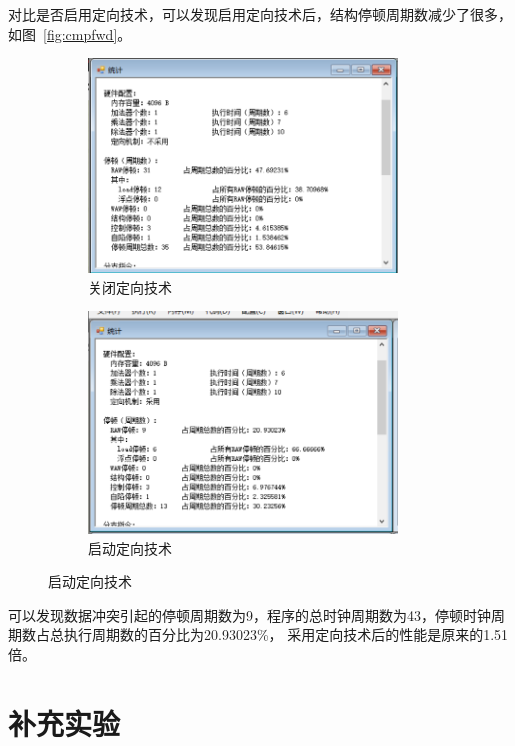 \documentclass[a4paper,twoside]{article}
\begin{document}
\begin{spacing}{1.2}
对比是否启用定向技术，可以发现启用定向技术后，结构停顿周期数减少了很多，如图~\ref{fig:cmpfwd}。
\begin{figure}[htb]
	\centering
	\begin{subfigure}[b]{0.4\textwidth}
		\centering
		\includegraphics[width=0.9\textwidth]{images/nofwdsts.png}
		\caption{关闭定向技术}
		\label{fig:nofwdsts}
	\end{subfigure}
	\begin{subfigure}[b]{0.4\textwidth}
		\centering
		\includegraphics[width=0.9\textwidth]{images/withfwdsts.png}
		\caption{启动定向技术}
		\label{fig:withfwdsts}
	\end{subfigure}
\end{figure}

可以发现数据冲突引起的停顿周期数为9，程序的总时钟周期数为43，停顿时钟周期数占总执行周期数的百分比为20.93023\%，
采用定向技术后的性能是原来的1.51倍。

\section{补充实验}


\end{spacing}
\end{document}
